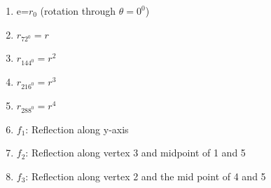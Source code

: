 \documentclass{article}
\begin{document}
\begin{enumerate}
\item e=$r_0$ (rotation through $\theta=0^0$)


\item{$r_{72^0}=r$ }\\
\item{$r_{144^0}=r^2$ }\\
\item{$r_{216^0}=r^3$ }\\

\item{$r_{288^0}=r^4$ }\\
\vspace{7cm}
\newcommand{\pentagonDrawl}[5]{
\drawGraphNo{3}
\node (p) [draw,rotate=70,minimum size=2.7cm,regular polygon, regular polygon sides=5] at (0,-0.4) {};
\tikzstyle{every node}=[draw,color=black];
\node[anchor=1*(360/9)]at(p.corner 1){$#1$};
\node[anchor=2*(360/9)]at(p.corner 2){$#5$};
\node[anchor=3*(360/9)]at(p.corner 3){$#4$};
\node[anchor=4*(360/9)]at(p.corner 4){$#3$};
\node[anchor=5*(360/9)]at(p.corner 5){$#2$};
}

\vspace{3cm}
\item{$f_1$: Reflection along y-axis }


\item{$f_2$: Reflection along vertex $3$ and midpoint of 1 and 5}


\item{$f_3$: Reflection along vertex 2 and the mid point of 4 and 5}


\end{enumerate}
\end{document}
